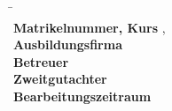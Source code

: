 \begin{titlepage}
      \vfill
      \begin{spacing}{1.2}
        \centering
        \begin{tabbing}
            \hspace{6.5cm}                   \= \kill\\
            \textbf{Matrikelnummer, Kurs}  \>  \myMatrikelnummer, \myKurs\\
            \textbf{Ausbildungsfirma}      \>  \myAusbildungsfirma\\
            \textbf{Betreuer}         \>  \myErstgutachter\\
            \ifx\myZweigutachter\undefined
            \else
            \textbf{Zweitgutachter}        \>  \myZweigutachter\\
            \fi
            \textbf{Bearbeitungszeitraum}  \>  \Bearbeitungszeitraum\\
        \end{tabbing}
      \end{spacing}
\end{titlepage}
